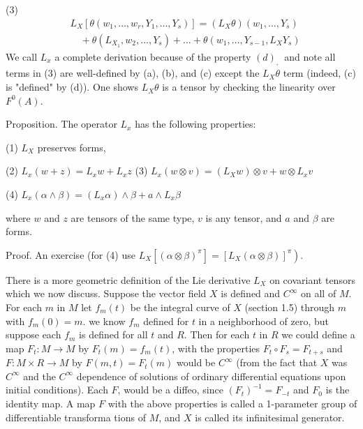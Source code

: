 \documentclass[10pt]{article}
\begin{document}
(3)
$$
\begin{aligned}
&L_{X}\left[\theta\left(w_{1}, \ldots, w_{r}, Y_{1}, \ldots, Y_{s}\right)\right]=\left(L_{X} \theta\right)\left(w_{1}, \ldots, Y_{s}\right) \\
&\quad+\theta\left(L_{X_{1}}, w_{2}, \ldots, Y_{s}\right)+\ldots+\theta\left(w_{1}, \ldots, Y_{s-1}, L_{X} Y_{s}\right)
\end{aligned}
$$
We call $L_{x}$ a complete derivation because of the property $(d)_{\text {, }}$ and note all terms in (3) are well-defined by (a), (b), and (c) except the $L_{X} \theta$ term (indeed, (c) is "defined" by (d)). One shows $L_{X} \theta$ is a tensor by checking the linearity over $F^{0}(A)$.

Proposition. The operator $L_{x}$ has the following properties:

(1) $L_{X}$ preserves forms,

(2) $L_{x}(w+z)=L_{x} w+L_{x} z$ (3) $L_{x}(w \otimes v)=\left(L_{X} w\right) \otimes v+w \otimes L_{x} v$

(4) $L_{x}(\alpha \wedge \beta)=\left(L_{x} \alpha\right) \wedge \beta+a \wedge L_{x} \beta$

where $w$ and $z$ are tensors of the same type, $v$ is any tensor, and $a$ and $\beta$ are forms.

Proof. An exercise (for (4) use $\left.L_{X}\left[(\alpha \otimes \beta)^{\pi}\right]=\left[L_{X}(\alpha \otimes \beta)\right]^{\pi}\right)$.

There is a more geometric definition of the Lie derivative $L_{X}$ on covariant tensors which we now discuss. Suppose the vector field $X$ is defined and $C^{\infty}$ on all of $M$. For each $m$ in $M$ let $f_{m}(t)$ be the integral curve of $X$ (section 1.5) through $m$ with $f_{m}(0)=m$. we know $f_{m}$ defined for $t$ in a neighborhood of zero, but suppose each $f_{m}$ is defined for all $t$ and $R$. Then for each $t$ in $R$ we could define a map $F_{t}: M \rightarrow M$ by $F_{t}(m)=f_{m}(t)$, with the properties $F_{t} \circ F_{s}=F_{t+s}$ and $F: M \times R \rightarrow M$ by $F(m, t)=F_{t}(m)$ would be $C^{\infty}$ (from the fact that $X$ was $C^{\infty}$ and the $C^{\infty}$ dependence of solutions of ordinary differential equations upon initial conditions). Each $F$, would be a diffeo, since $\left(F_{t}\right)^{-1}=F_{-t}$ and $F_{0}$ is the identity map. A map $F$ with the above properties is called a 1-parameter group of differentiable transforma tions of $M$, and $X$ is called its infinitesimal generator.
\end{document}
